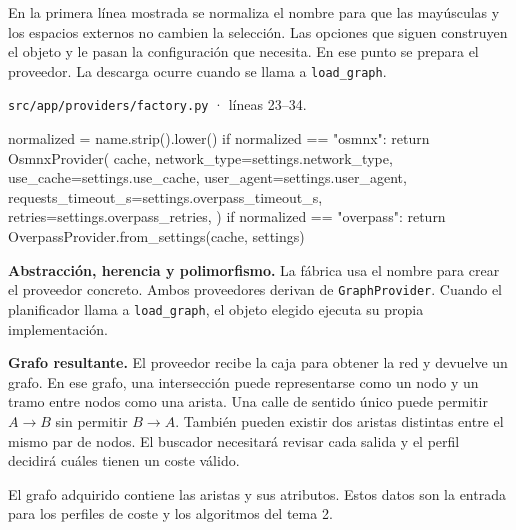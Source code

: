 \documentclass[11pt,a4paper]{article}
\begin{document}
En la primera línea mostrada se normaliza el nombre para que las mayúsculas y los espacios externos no cambien la selección. Las opciones que siguen construyen el objeto y le pasan la configuración que necesita. En ese punto se prepara el proveedor. La descarga ocurre cuando se llama a \texttt{load\_graph}.

\par\medskip
\noindent\begin{minipage}{\linewidth}
{\footnotesize\nolinkurl{src/app/providers/factory.py} · líneas 23--34.\par}
\nopagebreak[4]
\begin{Codigo}[firstnumber=23]
        normalized = name.strip().lower()
        if normalized == "osmnx":
            return OsmnxProvider(
                cache,
                network_type=settings.network_type,
                use_cache=settings.use_cache,
                user_agent=settings.user_agent,
                requests_timeout_s=settings.overpass_timeout_s,
                retries=settings.overpass_retries,
            )
        if normalized == "overpass":
            return OverpassProvider.from_settings(cache, settings)
\end{Codigo}
\end{minipage}\par

\textbf{Abstracción, herencia y polimorfismo.} La fábrica usa el nombre para crear el proveedor concreto. Ambos proveedores derivan de \texttt{GraphProvider}. Cuando el planificador llama a \texttt{load\_graph}, el objeto elegido ejecuta su propia implementación. 

\textbf{Grafo resultante.} El proveedor recibe la caja para obtener la red y devuelve un grafo. En ese grafo, una intersección puede representarse como un nodo y un tramo entre nodos como una arista. Una calle de sentido único puede permitir \(A\to B\) sin permitir \(B\to A\). También pueden existir dos aristas distintas entre el mismo par de nodos. El buscador necesitará revisar cada salida y el perfil decidirá cuáles tienen un coste válido.

El grafo adquirido contiene las aristas y sus atributos. Estos datos son la entrada para los perfiles de coste y los algoritmos del tema 2.
\end{document}
